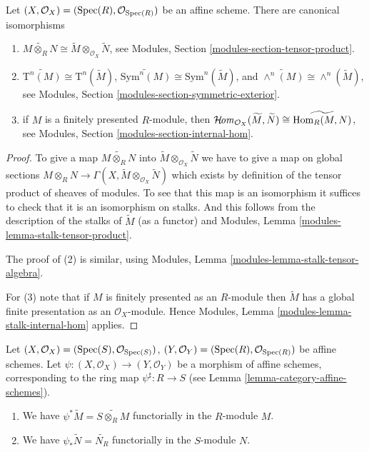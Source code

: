 \begin{lemma}
\label{lemma-widetilde-constructions}
Let $(X, \mathcal{O}_X) = (\mathop{\rm Spec}(R), \mathcal{O}_{\mathop{\rm Spec}(R)})$
be an affine scheme. There are canonical isomorphisms
\begin{enumerate}
\item
$
\widetilde{M \otimes_R N}
\cong
\widetilde M \otimes_{\mathcal{O}_X} \widetilde N
$,
see Modules, Section \ref{modules-section-tensor-product}.
\item
$
\widetilde{\text{T}^n(M)}
\cong
\text{T}^n(\widetilde M)
$,
$
\widetilde{\text{Sym}^n(M)}
\cong
\text{Sym}^n(\widetilde M)
$, and
$
\widetilde{\wedge^n(M)}
\cong
\wedge^n(\widetilde M)
$,
see
Modules, Section \ref{modules-section-symmetric-exterior}.
\item if $M$ is a finitely presented $R$-module, then
$
\mathop{\mathcal{H}\!{\it om}}\nolimits_{\mathcal{O}_X}(\widetilde M, \widetilde N)
\cong
\widetilde{\mathop{\rm Hom}\nolimits_R(M,  N)}
$,
see
Modules, Section \ref{modules-section-internal-hom}.
\end{enumerate}
\end{lemma}

\begin{proof}
To give a map $\widetilde{M \otimes_R N}$ into
$\widetilde M \otimes_{\mathcal{O}_X} \widetilde N$
we have to give a map on global sections
$M \otimes_R N \to
\Gamma(X, \widetilde M \otimes_{\mathcal{O}_X} \widetilde N)$
which exists by definition of the tensor product of sheaves
of modules. To see that this map is an isomorphism it
suffices to check that it is an isomorphism on stalks.
And this follows from the description of the stalks
of $\widetilde{M}$ (as a functor) and
Modules, Lemma \ref{modules-lemma-stalk-tensor-product}.

\medskip\noindent
The proof of (2) is similar, using
Modules, Lemma \ref{modules-lemma-stalk-tensor-algebra}.

\medskip\noindent
For (3) note that if $M$ is finitely presented as an $R$-module
then $\widetilde M$ has a global finite presentation as an
$\mathcal{O}_X$-module. Hence
Modules, Lemma \ref{modules-lemma-stalk-internal-hom} applies.
\end{proof}

\begin{lemma}
\label{lemma-widetilde-pullback}
Let
$(X, \mathcal{O}_X) = (\mathop{\rm Spec}(S), \mathcal{O}_{\mathop{\rm Spec}(S)})$,
$(Y, \mathcal{O}_Y) = (\mathop{\rm Spec}(R), \mathcal{O}_{\mathop{\rm Spec}(R)})$
be affine schemes.
Let $\psi : (X, \mathcal{O}_X) \to (Y, \mathcal{O}_Y)$ be a
morphism of affine schemes, corresponding to the ring map
$\psi^\sharp : R \to S$ (see Lemma \ref{lemma-category-affine-schemes}).
\begin{enumerate}
\item We have $\psi^* \widetilde M = \widetilde{S \otimes_R M}$
functorially in the $R$-module $M$.
\item We have $\psi_* \widetilde N = \widetilde{N_R}$ functorially
in the $S$-module $N$.
\end{enumerate}
\end{lemma}

